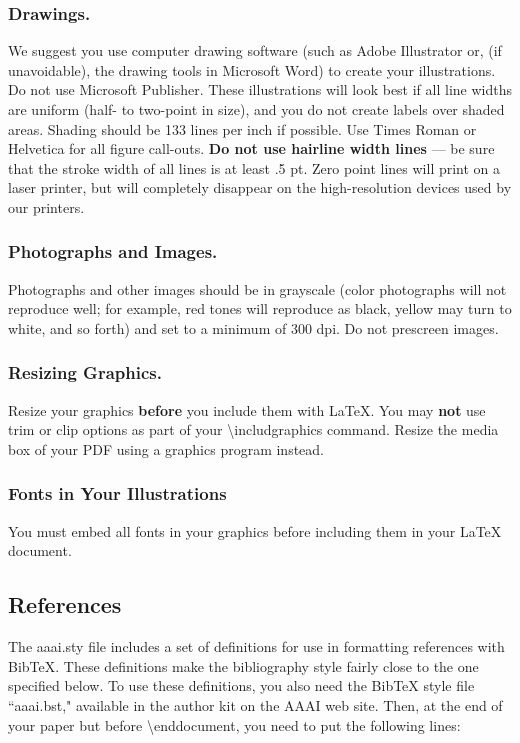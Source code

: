 \documentclass[letterpaper]{article}
\begin{document}
\subsubsection{Drawings.}
We suggest you use computer drawing software (such as Adobe Illustrator or, (if unavoidable), the drawing tools in Microsoft Word) to create your illustrations. Do not use Microsoft Publisher. These illustrations will look best if all line widths are uniform (half- to two-point in size), and you do not create labels over shaded areas. Shading should be 133 lines per inch if possible. Use Times Roman or Helvetica for all figure call-outs. \textbf{Do not use hairline width lines} --- be sure that the stroke width of all lines is at least .5 pt. Zero point lines will print on a laser printer, but will completely disappear on the high-resolution devices used by our printers.

\subsubsection{Photographs and Images.}
Photographs and other images should be in grayscale (color photographs will not reproduce well; for example, red tones will reproduce as black, yellow may turn to white, and so forth) and set to a minimum of 300 dpi. Do not prescreen images.

\subsubsection{Resizing Graphics.}
Resize your graphics \textbf{before} you include them with LaTeX. You may \textbf{not} use trim or clip options as part of your \textbackslash includgraphics command. Resize the media box of your PDF using a graphics program instead. 

\subsubsection{Fonts in Your Illustrations}
You must embed all fonts in your graphics before including them in your LaTeX document.

\subsection{References} 
The aaai.sty file includes a set of definitions for use in formatting references with BibTeX. These definitions make the bibliography style fairly close to the one specified below. To use these definitions, you also need the BibTeX style file ``aaai.bst," available in the author kit on the AAAI web site. Then, at the end of your paper but before \textbackslash end{document}, you need to put the following lines:
\end{document}
